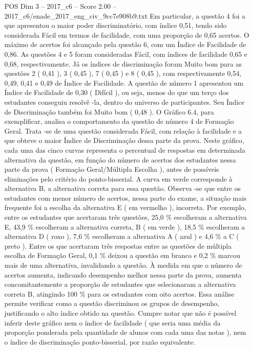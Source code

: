 \begin{textsample}{POS Dim 3 – 2017\_c6 – Score 2.00 – 2017\_c6/enade\_2017\_eng\_civ\_9cc7e908b9.txt}
Em particular, a questão 4 foi a que apresentou o maior poder discriminatório, com índice 0,51, tendo sido considerada Fácil em termos de facilidade, com uma proporção de 0,65 acertos.
O máximo de acertos foi alcançado pela questão 6, com um Índice de Facilidade de 0,86.
As questões 4 e 5 foram consideradas Fácil, com índices de facilidade 0,65 e 0,68, respectivamente.
Já os índices de discriminação foram Muito bom para as questões 2 ( 0,41 ), 3 ( 0,45 ), 7 ( 0,45 ) e 8 ( 0,45 ), com respectivamente 0,54, 0,49, 0,41 e 0,49 de Índice de Facilidade.
A questão de número 1 apresentou um Índice de Facilidade de 0,30 ( Difícil ), ou seja, menos do que um terço dos estudantes conseguiu resolvê -la, dentro do universo de participantes.
Seu Índice de Discriminação também foi Muito bom ( 0,48 ).
O Gráfico 6.4, para exemplificar, analisa o comportamento da questão de número 4 de Formação Geral.
Trata -se de uma questão considerada Fácil, com relação à facilidade e a que obteve o maior Índice de Discriminação dessa parte da prova.
Neste gráfico, cada uma das cinco curvas representa o percentual de respostas em determinada alternativa da questão, em função do número de acertos dos estudantes nessa parte da prova ( Formação Geral/Múltipla Escolha ), antes de possíveis eliminações pelo critério do ponto-bisserial.
A curva em verde corresponde à alternativa B, a alternativa correta para essa questão.
Observa -se que entre os estudantes com menor número de acertos, nessa parte do exame, a situação mais frequente foi a escolha da alternativa E ( em vermelho ), incorreta.
Por exemplo, entre os estudantes que acertaram três questões, 25,0 \% escolheram a alternativa E, 43,9 \% escolheram a alternativa correta, B ( em verde ), 18,5 \% escolheram a alternativa D ( roxo ), 7,6 \% escolheram a alternativa A ( azul ) e 4,6 \% a C ( preto ).
Entre os que acertaram três respostas entre as questões de múltipla escolha de Formação Geral, 0,1 \% deixou a questão em branco e 0,2 \% marcou mais de uma alternativa, invalidando a questão.
À medida em que o número de acertos aumenta, indicando desempenho melhor nessa parte da prova, aumenta concomitantemente a proporção de estudantes que selecionaram a alternativa correta B, atingindo 100 \% para os estudantes com oito acertos.
Essa análise permite verificar como a questão discriminou os grupos de desempenho, justificando o alto índice obtido na questão.
Cumpre notar que não é possível inferir deste gráfico nem o índice de facilidade ( que seria uma média da proporção ponderada pela quantidade de alunos com cada uma das notas ), nem o índice de discriminação ponto-bisserial, por razão equivalente.

\end{textsample}
